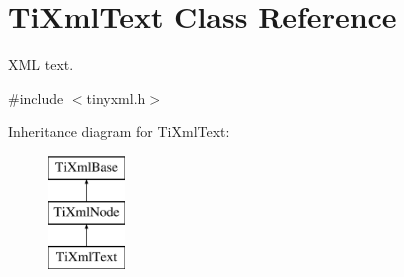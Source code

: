 \hypertarget{class_ti_xml_text}{
\section{TiXmlText Class Reference}
\label{class_ti_xml_text}
}


XML text.  




{\ttfamily \#include $<$tinyxml.h$>$}

Inheritance diagram for TiXmlText:\begin{figure}[H]
\begin{center}
\leavevmode
\includegraphics[height=3.000000cm]{class_ti_xml_text}
\end{center}
\end{figure}
